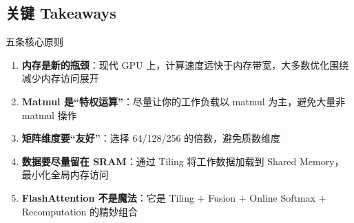 \subsection{关键 Takeaways}

\begin{importantbox}{五条核心原则}
\begin{enumerate}
    \item \textbf{内存是新的瓶颈}：现代 GPU 上，计算速度远快于内存带宽，大多数优化围绕减少内存访问展开
    \item \textbf{Matmul 是``特权运算''}：尽量让你的工作负载以 matmul 为主，避免大量非 matmul 操作
    \item \textbf{矩阵维度要``友好''}：选择 64/128/256 的倍数，避免质数维度
    \item \textbf{数据要尽量留在 SRAM}：通过 Tiling 将工作数据加载到 Shared Memory，最小化全局内存访问
    \item \textbf{FlashAttention 不是魔法}：它是 Tiling + Fusion + Online Softmax + Recomputation 的精妙组合
\end{enumerate}
\end{importantbox}


